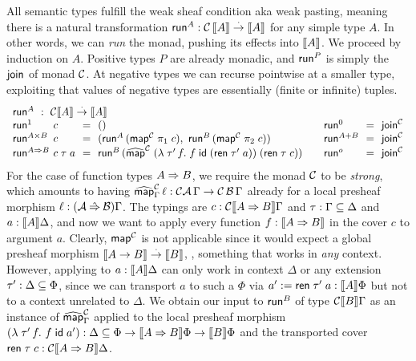 \documentclass[a4paper,USenglish,cleveref, autoref]{lipics-v2019}
\begin{document}
All semantic types fulfill the weak sheaf condition aka weak pasting,
meaning there is
a natural transformation $\trun^A : \C\,\den A \todot \den A$ for any simple
type $A$.  In other words, we can \emph{run} the monad, pushing its
effects into $\den A$.  We proceed by induction on $A$.
Positive types $P$ are already monadic,
and $\trun^P$ is simply the $\tjoin$ of monad $\C$.
At negative types we can recurse pointwise at a smaller type,
exploiting that values of negative types are essentially
(finite or infinite) tuples.
\[
\begin{array}{l@{~}l@{~~}c@{~~}l@{\qquad}l@{~~}c@{~~}l}
  \multicolumn 7 l {\trun^A ~:~ \C \den A \todot \den A} \\
  \trun^{\tyone} & c & = & \ttempty
    &
  \trun^{\tyzero} & = & \tjoin[\C]
    \\
  \trun^{A \times B} & c & = &
      (\trun^A\,(\tmap[\C]\;\pi_1\;c),\
       \trun^B\,(\tmap[\C]\;\pi_2\;c))
    &
  \trun^{A + B}   & = & \tjoin[\C]
  \\
  \trun^{A \To B} & c \; \tau \; a & = & \trun^B\,
      (\stmap[\C]\;(\lambda\;\tau'\,f.\;f\;\tid\;(\tren\;\tau'\;a))\;(\tren\;\tau\;c))
    &
  \trun^{o}      & = & \tjoin[\C]
\\
\end{array}
\]
For the case of function types $A \To B$, we require the monad $\C$ to be
\emph{strong}, which amounts to having
$\stmap[\C]_\Gamma\, \ell : \C\A\,\Gamma \to \C\,\B\,\Gamma$ already for
a local presheaf morphism $\ell : (\A \hatto \B)\Gamma$.
The typings are
$c : \C \den{A \To B} \Gamma$ and
$\tau : \Gamma \sublist \Delta$ and
$a : \den A \Delta$, and now we want to apply every function
$f : \den{A \To B}$ in the cover $c$ to argument $a$.  Clearly,
$\tmap[\C]$ is not applicable since it would expect a
global presheaf morphism
$\den{A \to B} \todot \den B$, \ie, something that works in \emph{any}
context.  However, applying to $a : \den A \Delta$ can only work in
context $\Delta$ or any extension $\tau' : \Delta \sublist \Phi$,
since we can transport $a$ to such a $\Phi$ via
$a' := \tren\; \tau'\; a : \den A \Phi$ but not to a context unrelated to
$\Delta$.  We obtain our input to $\trun^B$ of type $\C \den B \Gamma$
as an instance of $\stmap[\C]_\Gamma$ applied to the local presheaf morphism
$(\lambda \; \tau'\, f. \  f\;\tid\;a') :
\Delta \sublist \Phi \to  \den{A \To B}\Phi \to \den B \Phi$
and the transported cover $\tren\;\tau\;c : \C\den{A \To B}\Delta$.
\end{document}
